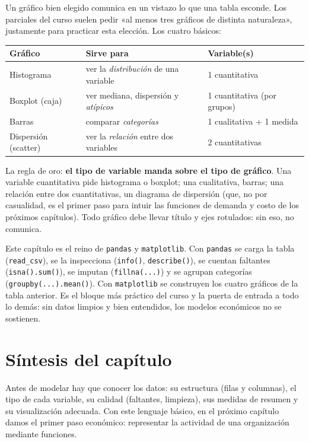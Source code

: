 Un gráfico bien elegido comunica en un vistazo lo que una tabla esconde. Los parciales del curso suelen pedir «al menos tres gráficos de distinta naturaleza», justamente para practicar esta elección. Los cuatro básicos:

\begin{center}
\renewcommand{\arraystretch}{1.3}
\begin{tabular}{p{3.4cm} p{4.2cm} p{4.8cm}}
\toprule
\textbf{Gráfico} & \textbf{Sirve para} & \textbf{Variable(s)} \\
\midrule
Histograma & ver la \emph{distribución} de una variable & 1 cuantitativa \\
Boxplot (caja) & ver mediana, dispersión y \emph{atípicos} & 1 cuantitativa (por grupos) \\
Barras & comparar \emph{categorías} & 1 cualitativa + 1 medida \\
Dispersión (scatter) & ver la \emph{relación} entre dos variables & 2 cuantitativas \\
\bottomrule
\end{tabular}
\end{center}

La regla de oro: \textbf{el tipo de variable manda sobre el tipo de gráfico}. Una variable cuantitativa pide histograma o boxplot; una cualitativa, barras; una relación entre dos cuantitativas, un diagrama de dispersión (que, no por casualidad, es el primer paso para intuir las funciones de demanda y costo de los próximos capítulos). Todo gráfico debe llevar título y ejes rotulados: sin eso, no comunica.

\begin{labbox}
Este capítulo es el reino de \texttt{pandas} y \texttt{matplotlib}. Con \texttt{pandas} se carga la tabla (\texttt{read\_csv}), se la inspecciona (\texttt{info()}, \texttt{describe()}), se cuentan faltantes (\texttt{isna().sum()}), se imputan (\texttt{fillna(...)}) y se agrupan categorías (\texttt{groupby(...).mean()}). Con \texttt{matplotlib} se construyen los cuatro gráficos de la tabla anterior. Es el bloque más práctico del curso y la puerta de entrada a todo lo demás: sin datos limpios y bien entendidos, los modelos económicos no se sostienen.
\end{labbox}

\section{Síntesis del capítulo}

Antes de modelar hay que conocer los datos: su estructura (filas y columnas), el tipo de cada variable, su calidad (faltantes, limpieza), sus medidas de resumen y su visualización adecuada. Con este lenguaje básico, en el próximo capítulo damos el primer paso económico: representar la actividad de una organización mediante funciones.
